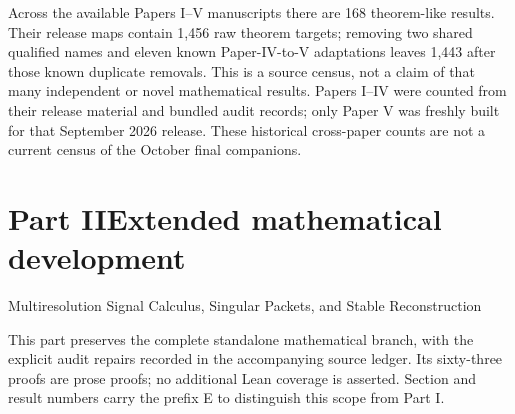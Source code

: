 \documentclass[11pt,a4paper]{article}
\theoremstyle{definition}
\theoremstyle{remark}
\begin{document}
Across the available Papers I--V manuscripts there are 168 theorem-like results. Their release maps contain 1,456 raw theorem targets; removing two shared qualified names and eleven known Paper-IV-to-V adaptations leaves 1,443 after those known duplicate removals. This is a source census, not a claim of that many independent or novel mathematical results. Papers I--IV were counted from their release material and bundled audit records; only Paper V was freshly built for that September 2026 release. These historical cross-paper counts are not a current census of the October final companions.

\clearpage
\part*{Part II\quad Extended mathematical development}
\begin{center}\large Multiresolution Signal Calculus, Singular Packets, and Stable Reconstruction\end{center}
\noindent This part preserves the complete standalone mathematical branch, with the explicit audit repairs recorded in the accompanying source ledger. Its sixty-three proofs are prose proofs; no additional Lean coverage is asserted. Section and result numbers carry the prefix E to distinguish this scope from Part I.
\setcounter{section}{0}\setcounter{figure}{0}\setcounter{table}{0}
\renewcommand{\thesection}{E\arabic{section}}
\renewcommand{\theHsection}{extension.\arabic{section}}
\renewcommand{\thefigure}{E\arabic{figure}}
\renewcommand{\theHfigure}{extension.\arabic{figure}}
\renewcommand{\thetable}{E\arabic{table}}
\renewcommand{\theHtable}{extension.\arabic{table}}
\graphicspath{{extension_figures/}}

\begin{abstract}
Signals on a lattice admit exact coordinates indexed by the residue classes of every finite index sublattice. Convolution becomes a matrix of packet transfers, while filter banks and packet trees become exact changes of coordinates. We develop this structure on sequence spaces, prove quantitative stability for imperfect and perturbed banks, and give an exact dynamic recursion for adaptive packet trees. A singular signal is written as a smooth component plus step or truncated power packets that record jumps in the signal and its derivatives. Retaining the correct packets leaves only the smooth approximation error. Estimated packets are governed by exact formulas involving value error, region overlap, boundary displacement, and the norm of the smooth approximation operator. The main recovery result treats separated jumps sampled on a uniform grid. An explicit contrast gap gives exact recovery of every jump cell, grid scale location accuracy, amplitude control, and finite norm consistency. Probability bounds cover sub Gaussian noise and repeated measurements. Haar coefficients, two shifted grids, and annihilating differences give complementary localization results. The final sections treat Gibbs oscillation, nonlinear residue interactions, numerical illustrations, and cyclic Cayley coordinates.
\end{abstract}
\end{document}
